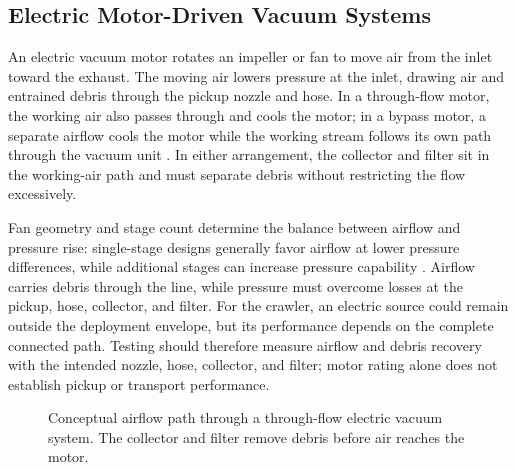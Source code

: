\subsection{Electric Motor-Driven Vacuum Systems}
\label{sec:electric-vacuums}
An electric vacuum motor rotates an impeller or fan to move air from the inlet toward the exhaust. The moving air lowers pressure at the inlet, drawing air and entrained debris through the pickup nozzle and hose. In a through-flow motor, the working air also passes through and cools the motor; in a bypass motor, a separate airflow cools the motor while the working stream follows its own path through the vacuum unit \citep{garantola2023UniversalBlowers}. In either arrangement, the collector and filter sit in the working-air path and must separate debris without restricting the flow excessively.

Fan geometry and stage count determine the balance between airflow and pressure rise: single-stage designs generally favor airflow at lower pressure differences, while additional stages can increase pressure capability \citep{garantola2023UniversalBlowers}. Airflow carries debris through the line, while pressure must overcome losses at the pickup, hose, collector, and filter. For the crawler, an electric source could remain outside the deployment envelope, but its performance depends on the complete connected path. Testing should therefore measure airflow and debris recovery with the intended nozzle, hose, collector, and filter; motor rating alone does not establish pickup or transport performance.

\begin{figure}[H]
\centering
{}
\caption[Airflow path through an electric vacuum motor]{Conceptual airflow path through a through-flow electric vacuum system. The collector and filter remove debris before air reaches the motor.}
\label{fig:electric-vacuum-airflow}
\end{figure}

